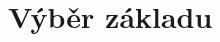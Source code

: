 \documentclass[thesis=B,czech]{FITthesis}[2011/06/14]
\begin{document}
% 
% 
% 
\section{Výběr základu}
% 
% 
% 
% 
\end{document}
